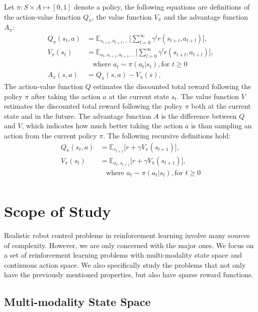 Let $\pi : S \times A \mapsto [0,1] $ denote a policy, the following equations are definitions of the action-value function $Q_\pi $, the value function $V_\pi $ and the advantage function $A_\pi $:
\begin{align}
Q_\pi(s_t,a) &= \mathbb{E}_{s_{t+1},a_{t+1},\ldots}
\big[ \sum_{l=0}^\infty \gamma^l r(s_{t+l},a_{t+l}) \big], \\
V_\pi(s_t) &= \mathbb{E}_{a_{t},s_{t+1},a_{t+1},\ldots}
\big[ \sum_{l=0}^\infty \gamma^l  r(s_{t+l},a_{t+l}) \big],\\
& \ \ \ \ \text{where } a_t \sim \pi (a_t|s_t), \text{for } t \geq 0  \\
A_\pi (s,a) &= Q_\pi (s,a) - V_\pi (s), 
\end{align}
The action-value function $Q$ estimates the discounted total reward following the policy $\pi$ after taking the action $a$ at the current state $s_t$. The value function $V$ estimates the discounted total reward following the policy $\pi$ both at the current state and in the future. The advantage function $A$ is the difference between $Q$ and $V$, which indicates how much better taking the action $a$ is than sampling an action from the current policy $\pi$.
The following recursive definitions hold:
\begin{align}
Q_\pi(s_t,a) &= \mathbb{E}_{s_{t+1}}
\big[ r + \gamma V_\pi(s_{t+1}) \big], \\
V_\pi(s_t) &= \mathbb{E}_{a_{t},s_{t+1}}
\big[ r + \gamma V_\pi(s_{t+1}) \big],\\
& \ \ \ \ \text{where } a_t \sim \pi (a_t|s_t), \text{for } t \geq 0  \\
\end{align}



\section{Scope of Study}
Realistic robot control problems in reinforcement learning involve many sources of complexity. However, we are only concerned with the major ones.
We focus on a set of reinforcement learning problems with multi-modality state space and continuous action space. We also specifically study the problems that not only have the previously mentioned properties, but also have sparse reward functions.

\subsection{Multi-modality State Space}

